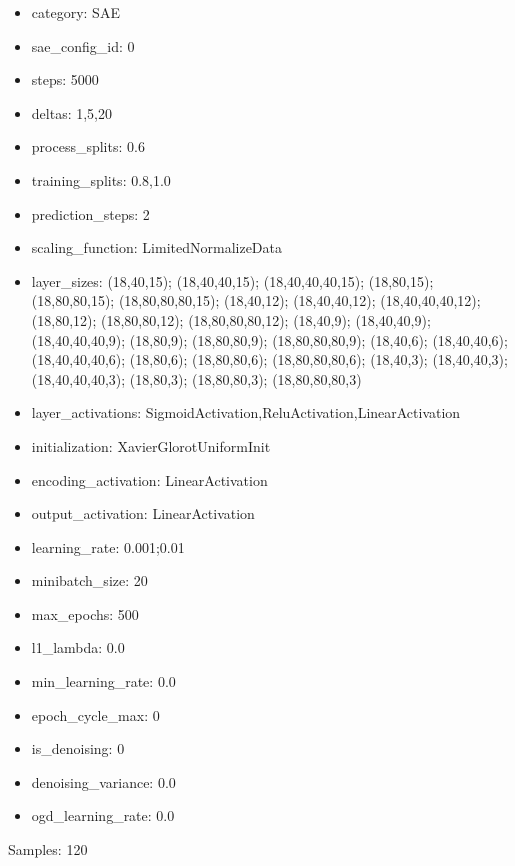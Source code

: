 \documentclass[a4paper,11pt,oneside]{article}
\theoremstyle{plain}
\theoremstyle{definition}
\begin{document}
\begin{itemize}
	\item category: SAE
	\item sae\_config\_id: 0
	\item steps: 5000
	\item deltas: 1,5,20
	\item process\_splits: 0.6
	\item training\_splits: 0.8,1.0
	\item prediction\_steps: 2
	\item scaling\_function: LimitedNormalizeData
	\item layer\_sizes: (18,40,15); (18,40,40,15); (18,40,40,40,15); (18,80,15); (18,80,80,15); (18,80,80,80,15); (18,40,12); (18,40,40,12); (18,40,40,40,12); (18,80,12); (18,80,80,12); (18,80,80,80,12); (18,40,9); (18,40,40,9); (18,40,40,40,9); (18,80,9); (18,80,80,9); (18,80,80,80,9); (18,40,6); (18,40,40,6); (18,40,40,40,6); (18,80,6); (18,80,80,6); (18,80,80,80,6); (18,40,3); (18,40,40,3); (18,40,40,40,3); (18,80,3); (18,80,80,3); (18,80,80,80,3)
	\item layer\_activations: SigmoidActivation,ReluActivation,LinearActivation
	\item initialization: XavierGlorotUniformInit
	\item encoding\_activation: LinearActivation
	\item output\_activation: LinearActivation
	\item learning\_rate: 0.001;0.01
	\item minibatch\_size: 20
	\item max\_epochs: 500
	\item l1\_lambda: 0.0
	\item min\_learning\_rate: 0.0
	\item epoch\_cycle\_max: 0
	\item is\_denoising: 0
	\item denoising\_variance: 0.0
	\item ogd\_learning\_rate: 0.0
\end{itemize}

Samples: 120

\newpage






\end{document}
